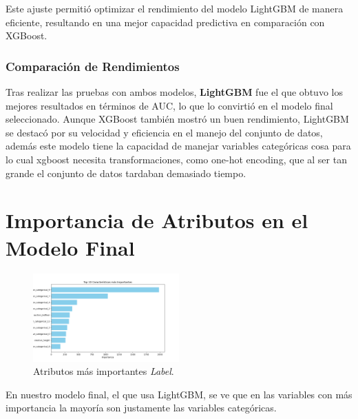 \documentclass[a4paper,11pt]{article}
\begin{document}
Este ajuste permitió optimizar el rendimiento del modelo LightGBM de manera eficiente, resultando en una mejor capacidad predictiva en comparación con XGBoost.

\subsubsection{Comparación de Rendimientos}

Tras realizar las pruebas con ambos modelos, \textbf{LightGBM} fue el que obtuvo los mejores resultados en términos de AUC, lo que lo convirtió en el modelo final seleccionado. Aunque XGBoost también mostró un buen rendimiento, LightGBM se destacó por su velocidad y eficiencia en el manejo del conjunto de datos, además este modelo tiene la capacidad de manejar variables categóricas cosa para lo cual xgboost necesita transformaciones, como one-hot encoding, que al ser tan grande el conjunto de datos tardaban demasiado tiempo. 

\section{Importancia de Atributos en el Modelo Final}
    
\begin{figure}[H]
    \centering
    \includegraphics[width=0.5\textwidth]{correlaciones_modelo.png}
    \caption{Atributos más importantes \textit{Label}.}
\end{figure}

En nuestro modelo final, el que usa LightGBM, se ve que en las variables con más importancia la mayoría son justamente las variables categóricas.
\end{document}
